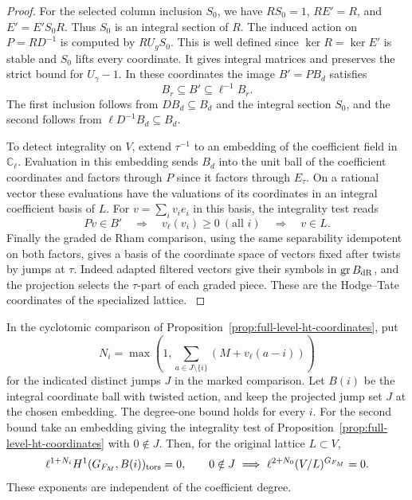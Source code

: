 \begin{proof}
For the selected column inclusion \(S_0\), we have
\(RS_0=1\), \(RE'=R\), and \(E'=E'S_0R\).
Thus \(S_0\) is an integral section of \(R\).
The induced action on \(P=RD^{-1}\) is computed by
\(R U_g S_0\). This is well defined since \(\ker R=\ker E'\)
is stable and \(S_0\) lifts every coordinate.
It gives integral matrices and preserves the strict
bound for \(U_\gamma-1\).
In these coordinates the image \(B'=P B_d\) satisfies
\[
                         B_r\subseteq B'\subseteq \ell^{-1}B_r.
\]
The first inclusion follows from \(D B_d\subseteq B_d\)
and the integral section \(S_0\), and the second follows
from \(\ell D^{-1} B_d\subseteq B_d\).

To detect integrality on \(V\), extend \(\tau^{-1}\)
to an embedding of the coefficient field in
\(\mathbb C_\ell\). Evaluation in this embedding sends
\(B_d\) into the unit ball of the coefficient
coordinates and factors through \(P\) since it
factors through \(E_\tau\).
On a rational vector these evaluations have the
valuations of its coordinates in an integral
coefficient basis of \(L\). For \(v=\sum_i v_i e_i\) in this basis, the integrality test reads
\[
 Pv\in B'\quad\Longrightarrow\quad v_\ell(v_i)\ge0\ (\text{all }i)\quad\Longrightarrow\quad v\in L.
\]
Finally the graded de Rham
comparison, using the same separability idempotent
on both factors, gives a basis of the coordinate
space of vectors fixed after twists by jumps at \(\tau\).
Indeed adapted filtered vectors give their symbols in
\(\operatorname{gr} B_{\rm dR}\), and the projection
selects the \(\tau\)-part of each graded piece.
These are the Hodge--Tate coordinates of the
specialized lattice. \label{cor:ramified-cyclotomic-3}
\end{proof}

\begin{lemma}\label{lem:cyclotomic-invariant-loss}
In the cyclotomic comparison of Proposition~\ref{prop:full-level-ht-coordinates}, put
\[
 N_i=\max\left(1,\sum_{a\in J\setminus\{i\}}
                    (M+v_\ell(a-i))\right)
\]
for the indicated distinct jumps \(J\) in the marked comparison.
Let \(B(i)\) be the integral coordinate ball with twisted action,
and keep the projected jump set \(J\) at the chosen embedding.
The degree-one bound holds for every \(i\). For the second bound
take an embedding giving the integrality test of
Proposition~\ref{prop:full-level-ht-coordinates} with \(0\notin J\).
Then, for the original lattice \(L\subset V\),
\[
 \ell^{1+N_i} H^1(G_{F_M},B(i))_{\rm tors}=0,\qquad
 0\notin J\ \Longrightarrow\ \ell^{2+N_0}(V/L)^{G_{F_M}}=0.
\]
These exponents are independent of the coefficient degree.
\end{lemma}

